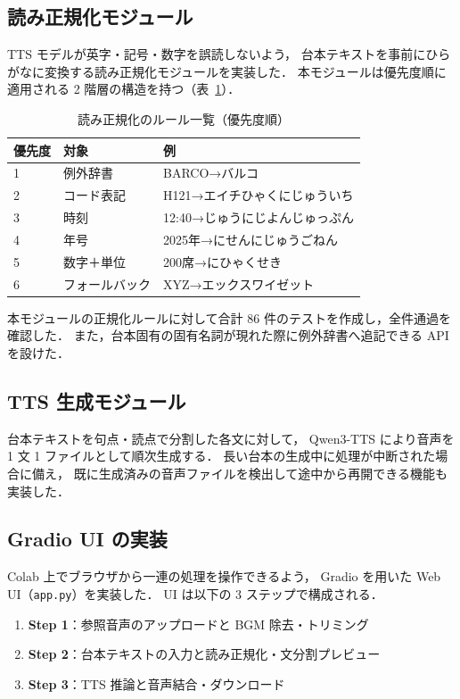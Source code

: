 \documentclass[uplatex,a4paper,10pt,twocolumn]{jsarticle}
\begin{document}
\subsection{読み正規化モジュール}

TTS モデルが英字・記号・数字を誤読しないよう，
台本テキストを事前にひらがなに変換する読み正規化モジュールを実装した．
本モジュールは優先度順に適用される 2 階層の構造を持つ（表~\ref{tbl:normalizer}）．

\begin{table}[t]
  \caption{読み正規化のルール一覧（優先度順）}
  \label{tbl:normalizer}
  \begin{tabular}{lll}
    \hline
    優先度 & 対象 & 例 \\
    \hline
    1 & 例外辞書 & BARCO→バルコ \\
    2 & コード表記 & H121→エイチひゃくにじゅういち \\
    3 & 時刻 & 12:40→じゅうにじよんじゅっぷん \\
    4 & 年号 & 2025年→にせんにじゅうごねん \\
    5 & 数字＋単位 & 200席→にひゃくせき \\
    6 & フォールバック & XYZ→エックスワイゼット \\
    \hline
  \end{tabular}
\end{table}

本モジュールの正規化ルールに対して合計 86 件のテストを作成し，全件通過を確認した．
また，台本固有の固有名詞が現れた際に例外辞書へ追記できる API を設けた．

\subsection{TTS 生成モジュール}

台本テキストを句点・読点で分割した各文に対して，
Qwen3-TTS により音声を 1 文 1 ファイルとして順次生成する．
長い台本の生成中に処理が中断された場合に備え，
既に生成済みの音声ファイルを検出して途中から再開できる機能も実装した．

\subsection{Gradio UI の実装}

Colab 上でブラウザから一連の処理を操作できるよう，
Gradio を用いた Web UI（\texttt{app.py}）を実装した．
UI は以下の 3 ステップで構成される．

\begin{enumerate}
  \item \textbf{Step 1}：参照音声のアップロードと BGM 除去・トリミング
  \item \textbf{Step 2}：台本テキストの入力と読み正規化・文分割プレビュー
  \item \textbf{Step 3}：TTS 推論と音声結合・ダウンロード
\end{enumerate}
\end{document}

